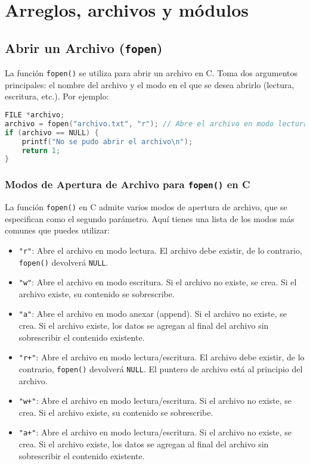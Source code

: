\section{Arreglos, archivos y módulos}
\subsection{Abrir un Archivo (\texttt{fopen})}

La función \texttt{fopen()} se utiliza para abrir un archivo en C. Toma dos argumentos principales: el nombre del archivo y el modo en el que se desea abrirlo (lectura, escritura, etc.). Por ejemplo:

\begin{lstlisting}[language=C]
FILE *archivo;
archivo = fopen("archivo.txt", "r"); // Abre el archivo en modo lectura
if (archivo == NULL) {
    printf("No se pudo abrir el archivo\n");
    return 1;
}
\end{lstlisting}

\subsubsection{Modos de Apertura de Archivo para \texttt{fopen()} en C}

La función \texttt{fopen()} en C admite varios modos de apertura de archivo, que se especifican como el segundo parámetro. Aquí tienes una lista de los modos más comunes que puedes utilizar:

\begin{itemize}[label=--,leftmargin=*]
    \item \texttt{"r"}: Abre el archivo en modo lectura. El archivo debe existir, de lo contrario, \texttt{fopen()} devolverá \texttt{NULL}.
    
    \item \texttt{"w"}: Abre el archivo en modo escritura. Si el archivo no existe, se crea. Si el archivo existe, su contenido se sobrescribe.
    
    \item \texttt{"a"}: Abre el archivo en modo anexar (append). Si el archivo no existe, se crea. Si el archivo existe, los datos se agregan al final del archivo sin sobrescribir el contenido existente.
    
    \item \texttt{"r+"}: Abre el archivo en modo lectura/escritura. El archivo debe existir, de lo contrario, \texttt{fopen()} devolverá \texttt{NULL}. El puntero de archivo está al principio del archivo.
    
    \item \texttt{"w+"}: Abre el archivo en modo lectura/escritura. Si el archivo no existe, se crea. Si el archivo existe, su contenido se sobrescribe.
    
    \item \texttt{"a+"}: Abre el archivo en modo lectura/escritura. Si el archivo no existe, se crea. Si el archivo existe, los datos se agregan al final del archivo sin sobrescribir el contenido existente.
\end{itemize}

